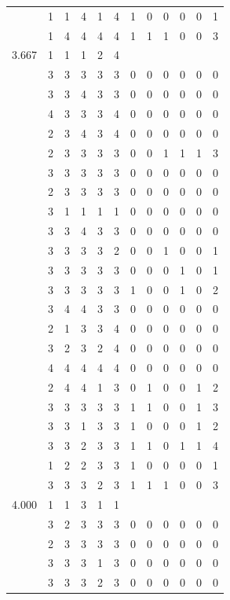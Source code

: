 \documentclass[]{msu-thesis}
\theoremstyle{definition}
\theoremstyle{definition}
\theoremstyle{definition}
\theoremstyle{remark}
\begin{document}
\begin{table}
{\begin{tabular}[t]{rrrrrrrrrrrr}
 & 1 & 1 & 4 & 1 & 4 & 1 & 0 & 0 & 0 & 0 & 1\\
 & 1 & 4 & 4 & 4 & 4 & 1 & 1 & 1 & 0 & 0 & 3\\
3.667 & 1 & 1 & 1 & 2 & 4 &  &  &  &  &  & \\
 & 3 & 3 & 3 & 3 & 3 & 0 & 0 & 0 & 0 & 0 & 0\\
 & 3 & 3 & 4 & 3 & 3 & 0 & 0 & 0 & 0 & 0 & 0\\
 & 4 & 3 & 3 & 3 & 4 & 0 & 0 & 0 & 0 & 0 & 0\\
 & 2 & 3 & 4 & 3 & 4 & 0 & 0 & 0 & 0 & 0 & 0\\
 & 2 & 3 & 3 & 3 & 3 & 0 & 0 & 1 & 1 & 1 & 3\\
 & 3 & 3 & 3 & 3 & 3 & 0 & 0 & 0 & 0 & 0 & 0\\
 & 2 & 3 & 3 & 3 & 3 & 0 & 0 & 0 & 0 & 0 & 0\\
 & 3 & 1 & 1 & 1 & 1 & 0 & 0 & 0 & 0 & 0 & 0\\
 & 3 & 3 & 4 & 3 & 3 & 0 & 0 & 0 & 0 & 0 & 0\\
 & 3 & 3 & 3 & 3 & 2 & 0 & 0 & 1 & 0 & 0 & 1\\
 & 3 & 3 & 3 & 3 & 3 & 0 & 0 & 0 & 1 & 0 & 1\\
 & 3 & 3 & 3 & 3 & 3 & 1 & 0 & 0 & 1 & 0 & 2\\
 & 3 & 4 & 4 & 3 & 3 & 0 & 0 & 0 & 0 & 0 & 0\\
 & 2 & 1 & 3 & 3 & 4 & 0 & 0 & 0 & 0 & 0 & 0\\
 & 3 & 2 & 3 & 2 & 4 & 0 & 0 & 0 & 0 & 0 & 0\\
 & 4 & 4 & 4 & 4 & 4 & 0 & 0 & 0 & 0 & 0 & 0\\
 & 2 & 4 & 4 & 1 & 3 & 0 & 1 & 0 & 0 & 1 & 2\\
 & 3 & 3 & 3 & 3 & 3 & 1 & 1 & 0 & 0 & 1 & 3\\
 & 3 & 3 & 1 & 3 & 3 & 1 & 0 & 0 & 0 & 1 & 2\\
 & 3 & 3 & 2 & 3 & 3 & 1 & 1 & 0 & 1 & 1 & 4\\
 & 1 & 2 & 2 & 3 & 3 & 1 & 0 & 0 & 0 & 0 & 1\\
 & 3 & 3 & 3 & 2 & 3 & 1 & 1 & 1 & 0 & 0 & 3\\
4.000 & 1 & 1 & 3 & 1 & 1 &  &  &  &  &  & \\
 & 3 & 2 & 3 & 3 & 3 & 0 & 0 & 0 & 0 & 0 & 0\\
 & 2 & 3 & 3 & 3 & 3 & 0 & 0 & 0 & 0 & 0 & 0\\
 & 3 & 3 & 3 & 1 & 3 & 0 & 0 & 0 & 0 & 0 & 0\\
 & 3 & 3 & 3 & 2 & 3 & 0 & 0 & 0 & 0 & 0 & 0\\

\end{tabular}}
\end{table}
\end{document}
